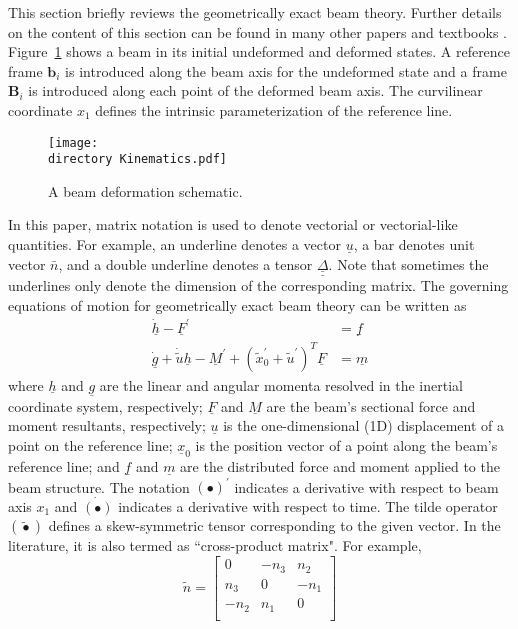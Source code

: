 \documentclass{aiaa-tc}
\def\directory{EPSF/}
\renewcommand{\vec}[1]{\underline{#1}}
\renewcommand{\skew}[1]{\widetilde{#1}}
\begin{document}
This section briefly reviews the geometrically exact beam theory. Further details on the content of this section can be found in many other papers\cite{YuGEBT} and textbooks \cite{HodgesBeamBook,Bauchau:2010}.
Figure~\ref{Kinematics} shows a beam in its initial undeformed
and deformed states. A reference frame $\mathbf{b}_i$ is introduced along the
beam axis for the undeformed state and a frame $\mathbf{B}_i$ is introduced
along each point of the deformed beam axis. The curvilinear coordinate $x_1$ defines the intrinsic parameterization of the reference line.
\begin{figure}
\centering
\texttt{[image: \\directory Kinematics.pdf]}
\caption{A beam deformation schematic.} \label{Kinematics}
\end{figure}
In this paper, matrix notation is used to denote vectorial or vectorial-like quantities. For example, an underline denotes a vector $\underline{u}$, a bar denotes unit vector $\bar{n}$, and a double underline denotes a tensor $\underline{\underline{\Delta}}$. Note that sometimes the underlines only denote the dimension of the corresponding matrix. The governing equations of motion for geometrically exact beam theory can be written as \cite{Bauchau:2010}
\begin{align}
	\label{GovernGEBT-1}
	\dot{\underline{h}} - \underline{F}^\prime &= \underline{f} \\
	\label{GovernGEBT-2}
	\dot{\underline{g}} + \dot{\tilde{u}} \underline{h} - \underline{M}^\prime + (\tilde{x}_0^\prime + \tilde{u}^\prime)^T \underline{F} &= \underline{m}
\end{align}
where $\vec{h}$ and $\vec{g}$ are the linear and angular momenta resolved in the inertial coordinate system, respectively; $\vec{F}$ and $\vec{M}$ are the beam's sectional force and moment resultants, respectively; $\vec{u}$ is the one-dimensional (1D) displacement of a point on the reference line; $\vec{x}_0$ is the position vector of a point along the beam's reference line;  and $\vec{f}$ and $\vec{m}$ are the distributed force and moment applied to the beam structure.  The notation $(\bullet)^\prime$ indicates a derivative with respect to beam axis $x_1$ and $\dot{(\bullet)}$ indicates a derivative with respect to time. The tilde operator $(\skew{\bullet})$ defines a skew-symmetric tensor corresponding to the given vector. In the literature, it is also termed as ``cross-product matrix". For example,
\[
	\skew{n} = 
	     		\begin{bmatrix}
			0 & -n_3 & n_2 \\
			n_3 & 0 & -n_1 \\
			-n_2 & n_1 & 0\\
			\end{bmatrix}	
\]
\end{document}
